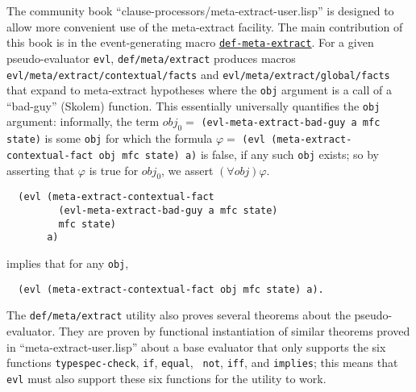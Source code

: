 The community book ``clause-processors/meta-extract-user.lisp'' is
designed to allow more convenient use of the meta-extract facility.
The main contribution of this book is in the event-generating macro
\href{http://www.cs.utexas.edu/users/moore/acl2/manuals/current/manual/index.html?topic=ACL2\_\_\_\_DEF-META-EXTRACT}{\underline{\tt def-meta-extract}}. For a given pseudo-evaluator \texttt{evl},
\texttt{def\-/meta\-/extract} produces macros
\texttt{evl\-/meta\-/extract\-/contextual\-/facts} and
\texttt{evl\-/meta\-/extract\-/global\-/facts} that expand to meta-extract
hypotheses where the \texttt{obj} argument is a call of a ``bad-guy'' (Skolem)
function.  This essentially universally quantifies the \texttt{obj}
argument: informally, the term $obj_0 = $ {\tt (evl-meta-extract-bad-guy a mfc state)} is
some {\tt obj} for which the formula $\varphi = $ {\tt (evl (meta-extract-contextual-fact obj
  mfc state) a)} is false, if any such {\tt obj} exists; so by
asserting that $\varphi$ is true for $obj_0$, we assert $(\forall obj)
\varphi$.
\begin{verbatim}
  (evl (meta-extract-contextual-fact
         (evl-meta-extract-bad-guy a mfc state)
         mfc state)
       a)
\end{verbatim}
implies that for any \texttt{obj},
\begin{verbatim}
  (evl (meta-extract-contextual-fact obj mfc state) a).
\end{verbatim}

The \texttt{def\-/meta\-/extract} utility also proves several theorems
about the pseudo-evaluator.  They are proven by
functional instantiation of similar theorems proved in
``meta-extract-user.lisp'' about a base evaluator that only supports
the six functions {\tt typespec-check}, {\tt if}, {\tt equal}, {\tt
  not}, {\tt iff}, and {\tt implies}; this means that {\tt evl} must
also support these six functions for the utility to work.


